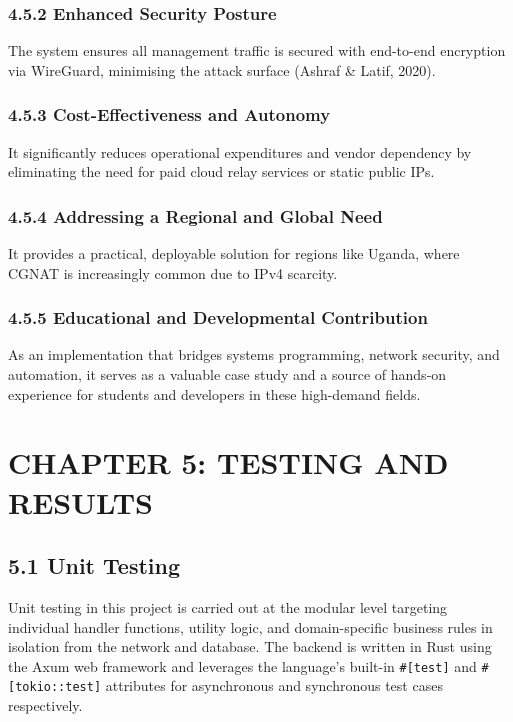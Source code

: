 \documentclass[12pt,a4paper,oneside]{report}
\begin{document}
\subsection{4.5.2 Enhanced Security Posture}

The system ensures all management traffic is secured with end-to-end encryption via WireGuard, minimising the attack surface (Ashraf \& Latif, 2020).

\subsection{4.5.3 Cost-Effectiveness and Autonomy}

It significantly reduces operational expenditures and vendor dependency by eliminating the need for paid cloud relay services or static public IPs.

\subsection{4.5.4 Addressing a Regional and Global Need}

It provides a practical, deployable solution for regions like Uganda, where CGNAT is increasingly common due to IPv4 scarcity.

\subsection{4.5.5 Educational and Developmental Contribution}

As an implementation that bridges systems programming, network security, and automation, it serves as a valuable case study and a source of hands-on experience for students and developers in these high-demand fields.

\chapter{CHAPTER 5: TESTING AND RESULTS}

\section{5.1 Unit Testing}

Unit testing in this project is carried out at the modular level targeting individual handler functions, utility logic, and domain-specific business rules in isolation from the network and database. The backend is written in Rust using the Axum web framework and leverages the language's built-in \texttt{\#[test]} and \texttt{\#[tokio::test]} attributes for asynchronous and synchronous test cases respectively.
\end{document}
